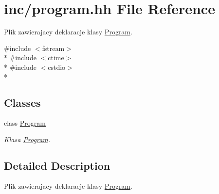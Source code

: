 \hypertarget{program_8hh}{\section{inc/program.hh File Reference}
\label{program_8hh}
}


Plik zawierajacy deklaracje klasy \hyperlink{class_program}{Program}.  


{\ttfamily \#include $<$fstream$>$}\\*
{\ttfamily \#include $<$ctime$>$}\\*
{\ttfamily \#include $<$cstdio$>$}\\*
\subsection*{Classes}
\begin{DoxyCompactItemize}
\item 
class \hyperlink{class_program}{Program}
\begin{DoxyCompactList}\small\item\em Klasa \hyperlink{class_program}{Program}. \end{DoxyCompactList}\end{DoxyCompactItemize}


\subsection{Detailed Description}
Plik zawierajacy deklaracje klasy \hyperlink{class_program}{Program}. 